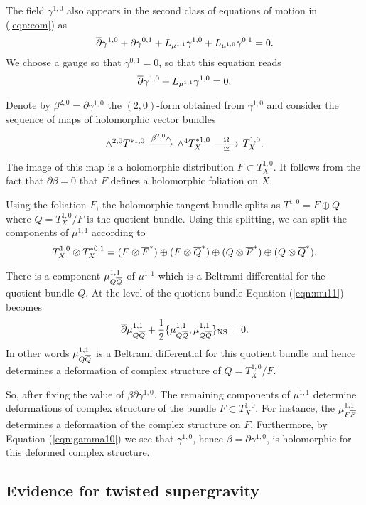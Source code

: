 \documentclass[11pt]{amsart}
\begin{document}
The field $\gamma^{1,0}$ also appears in the second class of equations of motion in (\ref{eqn:eom}) as
\[
  \dbar \gamma^{1,0} + \partial \gamma^{0,1} + L_{\mu^{1,1}} \gamma^{1,0} + L_{\mu^{1,0}} \gamma^{0,1} = 0 .
\]
We choose a gauge so that $\gamma^{0,1} = 0$,  so that this equation reads
\begin{equation}\label{eqn:gamma10}
  \dbar \gamma^{1,0} + L_{\mu^{1,1}} \gamma^{1,0} = 0 .
\end{equation}

Denote by $\beta^{2,0} = \partial \gamma^{1,0}$ the $(2,0)$-form obtained from $\gamma^{1,0}$ and consider the sequence of maps of holomorphic vector bundles
\[
  \begin{tikzcd}
    \wedge^{2,0} T^{*1,0} \ar[r, "\beta^{2,0} \wedge"] & \wedge^4 T_X^{*1,0} \ar[r, "\Omega", "\cong"'] & T^{1,0}_X .
  \end{tikzcd}
\]
The image of this map is a holomorphic distribution $F \subset T_X^{1,0}$.
It follows from the fact that $\partial \beta = 0$ that $F$ defines a holomorphic foliation on $X$.

Using the foliation $F$, the holomorphic tangent bundle splits as $T^{1,0} = F \oplus Q$ where $Q = T^{1,0}_X / F$ is the quotient bundle.
Using this splitting, we can split the components of $\mu^{1,1}$ according to
\[
  T^{1,0}_X \otimes T^{*0,1}_X = (F \otimes\Bar{F}^*) \oplus (F \otimes \Bar{Q}^*) \oplus (Q \otimes \Bar{F}^*) \oplus (Q \otimes \Bar{Q}^*) .
\]

There is a component $\mu_{Q\Bar{Q}}^{1,1}$ of $\mu^{1,1}$ which is a Beltrami differential for the quotient bundle $Q$.
At the level of the quotient bundle Equation (\ref{eqn:mu11}) becomes
\[
  \dbar \mu^{1,1}_{Q \Bar{Q}} + \frac12 \{\mu^{1,1}_{Q \Bar{Q}} , \mu^{1,1}_{Q \Bar{Q}}\}_{\rm NS} = 0 .
\]
In other words $\mu^{1,1}_{Q \Bar{Q}}$ is a Beltrami differential for this quotient bundle and hence determines a deformation of complex structure of $Q = T^{1,0}_X / F$.

So, after fixing the value of $\beta \partial \gamma^{1,0}$.
The remaining components of $\mu^{1,1}$ determine deformations of complex structure of the bundle $F \subset T^{1,0}_X$.
For instance, the $\mu^{1,1}_{F \Bar{F}}$ determines a deformation of the complex structure on $F$.
Furthermore, by Equation (\ref{eqn:gamma10}) we see that $\gamma^{1,0}$, hence $\beta = \partial \gamma^{1,0}$, is holomorphic for this deformed complex structure.


\subsection{Evidence for twisted supergravity}\label{sec:evidence}
\end{document}
